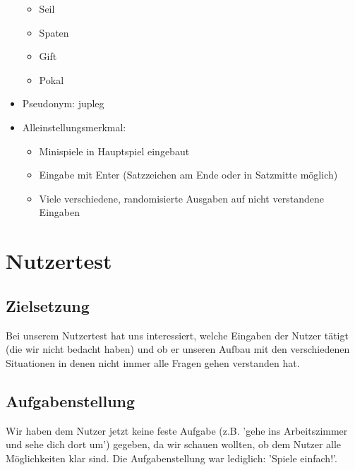 \documentclass[10pt,a4paper]{article}
\begin{document}
\begin{itemize}
\begin{itemize}
\item Seil
\item Spaten
\item Gift
\item Pokal
\end{itemize}
\item Pseudonym: jupleg
\item Alleinstellungsmerkmal:
\begin{itemize}
\item Minispiele in Hauptspiel eingebaut
\item Eingabe mit Enter (Satzzeichen am Ende oder in Satzmitte möglich)
\item Viele verschiedene, randomisierte Ausgaben auf nicht verstandene Eingaben
\end{itemize}
\end{itemize}

\section*{Nutzertest}
\subsection*{Zielsetzung}
Bei unserem Nutzertest hat uns interessiert, welche Eingaben der Nutzer tätigt (die wir nicht bedacht haben) und ob er unseren Aufbau mit den verschiedenen Situationen in denen nicht immer alle Fragen gehen verstanden hat. 
\subsection*{Aufgabenstellung}
Wir haben dem Nutzer jetzt keine feste Aufgabe (z.B. 'gehe ins Arbeitszimmer und sehe dich dort um') gegeben, da wir schauen wollten, ob dem Nutzer alle Möglichkeiten klar sind. Die Aufgabenstellung war lediglich: 'Spiele einfach!'. \\
\end{document}
